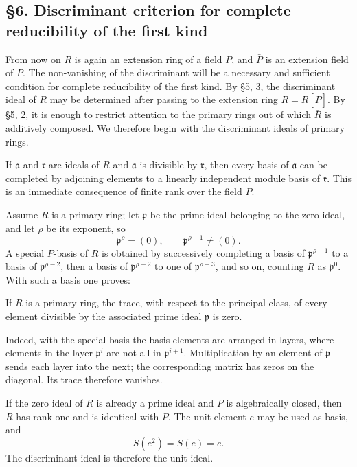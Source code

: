 \documentclass[11pt]{article}
\begin{document}
\subsection{§6. Discriminant criterion for complete reducibility of the
first
kind}\label{discriminant-criterion-for-complete-reducibility-of-the-first-kind}

From now on \(R\) is again an extension ring of a field \(P\), and
\(\bar P\) is an extension field of \(P\). The non-vanishing of the
discriminant will be a necessary and sufficient condition for complete
reducibility of the first kind. By §5, 3, the discriminant ideal of
\(R\) may be determined after passing to the extension ring
\(\bar R=R[\bar P]\). By §5, 2, it is enough to restrict attention to
the primary rings out of which \(\bar R\) is additively composed. We
therefore begin with the discriminant ideals of primary rings.

If \(\mathfrak a\) and \(\mathfrak r\) are ideals of \(R\) and
\(\mathfrak a\) is divisible by \(\mathfrak r\), then every basis of
\(\mathfrak a\) can be completed by adjoining elements to a linearly
independent module basis of \(\mathfrak r\). This is an immediate
consequence of finite rank over the field \(P\).

Assume \(R\) is a primary ring; let \(\mathfrak p\) be the prime ideal
belonging to the zero ideal, and let \(\rho\) be its exponent, so \[
  \mathfrak p^{\rho}=(0),
  \qquad \mathfrak p^{\rho-1}\ne(0).
\] A special \(P\)-basis of \(R\) is obtained by successively completing
a basis of \(\mathfrak p^{\rho-1}\) to a basis of
\(\mathfrak p^{\rho-2}\), then a basis of \(\mathfrak p^{\rho-2}\) to
one of \(\mathfrak p^{\rho-3}\), and so on, counting \(R\) as
\(\mathfrak p^0\). With such a basis one proves:

If \(R\) is a primary ring, the trace, with respect to the principal
class, of every element divisible by the associated prime ideal
\(\mathfrak p\) is zero.

Indeed, with the special basis the basis elements are arranged in
layers, where elements in the layer \(\mathfrak p^i\) are not all in
\(\mathfrak p^{i+1}\). Multiplication by an element of \(\mathfrak p\)
sends each layer into the next; the corresponding matrix has zeros on
the diagonal. Its trace therefore vanishes.

If the zero ideal of \(R\) is already a prime ideal and \(P\) is
algebraically closed, then \(R\) has rank one and is identical with
\(P\). The unit element \(e\) may be used as basis, and \[
  S(e^2)=S(e)=e.
\] The discriminant ideal is therefore the unit ideal.
\end{document}
